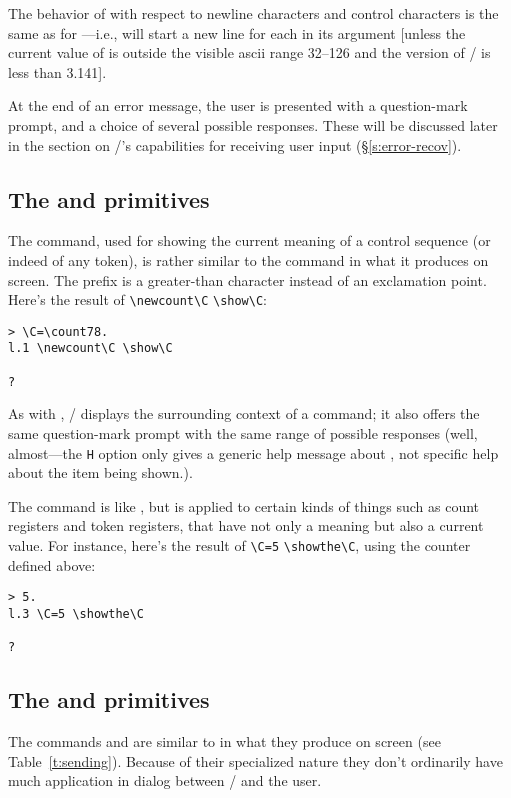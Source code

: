 { The behavior of  with respect to newline characters
and control characters is the same as for ---i.e.,
 will start a new line for each  in
its argument [unless the current value of
 is outside the visible {\sc ascii} range
32--126 and the version of \tex/ is less than 3.141].

At the end of an error message, the  user is presented with
a question-mark prompt, and a choice of several possible responses. These
will be discussed later in the section on \tex/'s capabilities
for receiving user input (\S\ref{s:error-recov}).

\subsection{The  and  primitives}

The  command,  used for showing the current meaning of a
control sequence (or indeed of any token), is rather similar to
the  command in what it produces on screen.  The
prefix is a greater-than character instead of an exclamation
point.  Here's the result of \verb|\newcount\C| \verb|\show\C|:
 \begin{verbatim}
> \C=\count78.
l.1 \newcount\C \show\C

?
\end{verbatim}
 As with , \tex/ displays the surrounding context of a
 command; it also offers the same question-mark
prompt with the same range of possible responses (well, almost---the
\verb|H| option only gives a generic help message about , not
specific help about the item being shown.).

The  command is like , but is applied
to certain kinds of things such as count registers and
token registers, that have not only a meaning but also a current value.
For instance, here's the result of \verb|\C=5|  \verb|\showthe\C|, using the
counter defined above:
 \begin{verbatim}
> 5.
l.3 \C=5 \showthe\C

?
\end{verbatim}

\subsection{The  and  primitives} The
commands  and  are similar to  in
what they produce on screen (see Table~\ref{t:sending}).  Because of
their specialized nature they don't ordinarily have much application
in dialog between \tex/ and the user.

}
